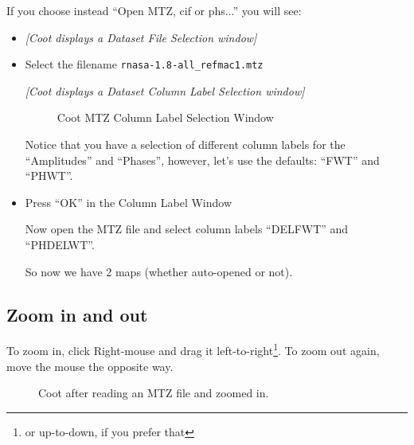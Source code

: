 \documentclass{article}
\begin{document}
If you choose instead ``Open MTZ, cif or phs...'' you will see:
\begin{itemize}

\item
\textsl{  [Coot displays a Dataset File Selection window]}

\item Select the filename \texttt{rnasa-1.8-all\_refmac1.mtz}

\textsl{  [Coot displays a Dataset Column Label Selection window]}


\begin{figure}[htbp]
  \begin{center}
    \leavevmode
    \epsfxsize 30mm
    \caption{Coot MTZ Column Label Selection Window}
    \label{fig:mtz_columns}
  \end{center}
\end{figure}

Notice that you have a selection of different column labels for the
``Amplitudes'' and ``Phases'', however, let's use the defaults:
``FWT'' and ``PHWT''.

\item Press \textsf{``OK''} in the Column Label Window

Now open the MTZ file and select column labels ``DELFWT'' and ``PHDELWT''.

So now we have 2 maps (whether auto-opened or not).
\end{itemize}


\subsection{Zoom in and out}
To zoom in, click Right-mouse and drag it left-to-right\footnote{or
  up-to-down, if you prefer that}. To zoom out again, move the mouse
the opposite way.

\begin{figure}[htbp]
  \begin{center}
    \leavevmode
    \epsfxsize 70mm
    \caption{Coot after reading an MTZ file and zoomed in.}
    \label{fig:map_screenshot}
  \end{center}
\end{figure}
\end{document}
